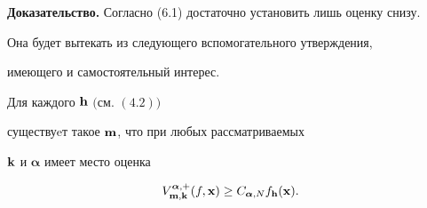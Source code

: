 {\bf Доказательство.} Согласно (6.1) достаточно установить лишь оценку снизу.


Она будет вытекать из следующего вспомогательного утверждения,


имеющего и самостоятельный интерес.








\begin{lems}


Для каждого ${\bold h}$ $($см. $(4.2))$


существуeт такое ${\bold m}$, что при любых рассматриваемых


${\bold k}$ и ${\boldsymbol {\alpha}}$ имеет место оценка


\begin{equation}


V_{{\bold m},{\bold k}}^{{\boldsymbol {\alpha}},+}(f,{\bold x})


\ge C_{{\boldsymbol {\alpha}},N}f_{{\bold h}}({\bold x}).


\end{equation}


\end{lems}









